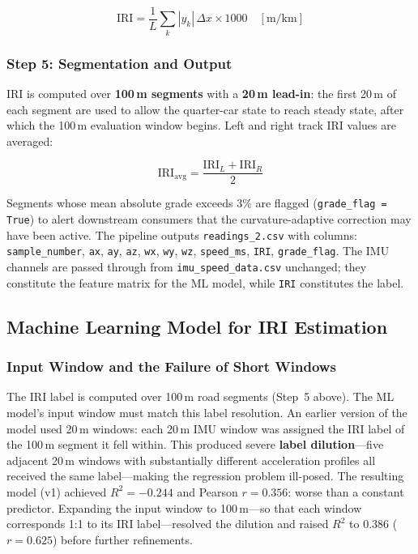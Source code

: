\documentclass[conference]{IEEEtran}
\begin{document}
\begin{equation}
\label{eq:iri_def}
\text{IRI} = \frac{1}{L} \sum_{k} |y_k|\, \Delta x \times 1000 \quad [\text{m/km}]
\end{equation}

\subsubsection{Step 5: Segmentation and Output}

IRI is computed over \textbf{100\,m segments} with a \textbf{20\,m lead-in}: the first 20\,m of each segment are used to allow the quarter-car state to reach steady state, after which the 100\,m evaluation window begins.
Left and right track IRI values are averaged:

\begin{equation}
\label{eq:iri_avg}
\text{IRI}_{\text{avg}} = \frac{\text{IRI}_L + \text{IRI}_R}{2}
\end{equation}

Segments whose mean absolute grade exceeds 3\% are flagged (\texttt{grade\_flag = True}) to alert downstream consumers that the curvature-adaptive correction may have been active.
The pipeline outputs \texttt{readings\_2.csv} with columns: \texttt{sample\_number}, \texttt{ax}, \texttt{ay}, \texttt{az}, \texttt{wx}, \texttt{wy}, \texttt{wz}, \texttt{speed\_ms}, \texttt{IRI}, \texttt{grade\_flag}.
The IMU channels are passed through from \texttt{imu\_speed\_data.csv} unchanged; they constitute the feature matrix for the ML model, while \texttt{IRI} constitutes the label.

\subsection{Machine Learning Model for IRI Estimation}
\label{sec:ml_model}

\subsubsection{Input Window and the Failure of Short Windows}

The IRI label is computed over 100\,m road segments (Step~5 above).
The ML model's input window must match this label resolution.
An earlier version of the model used 20\,m windows: each 20\,m IMU window was assigned the IRI label of the 100\,m segment it fell within.
This produced severe \textbf{label dilution}---five adjacent 20\,m windows with substantially different acceleration profiles all received the same label---making the regression problem ill-posed.
The resulting model (v1) achieved $R^2 = -0.244$ and Pearson $r = 0.356$: worse than a constant predictor.
Expanding the input window to 100\,m---so that each window corresponds 1:1 to its IRI label---resolved the dilution and raised $R^2$ to $0.386$ ($r = 0.625$) before further refinements.
\end{document}
